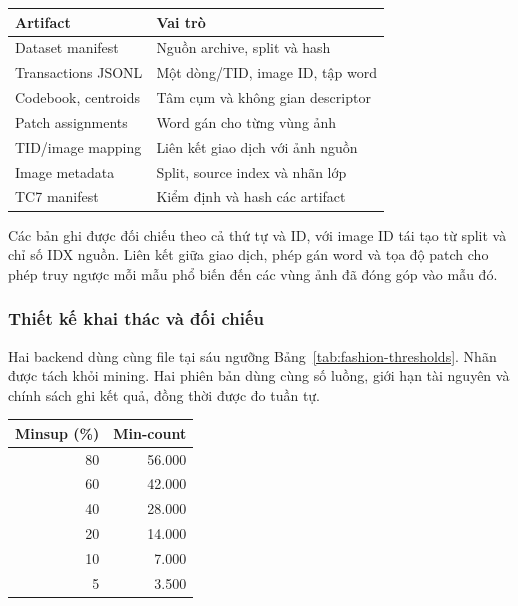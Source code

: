\begin{reporttable}
\caption{Artifact truy vết Fashion; các đường dẫn thuộc cùng một run.}
\label{tab:fashion-artifacts}
\footnotesize
\begin{tabular}{lp{}}\toprule
Artifact & Vai trò\\\midrule
Dataset manifest & Nguồn archive, split và hash\\
Transactions JSONL & Một dòng/TID, image ID, tập word\\
Codebook, centroids & Tâm cụm và không gian descriptor\\
Patch assignments & Word gán cho từng vùng ảnh\\
TID/image mapping & Liên kết giao dịch với ảnh nguồn\\
Image metadata & Split, source index và nhãn lớp\\
TC7 manifest & Kiểm định và hash các artifact\\\bottomrule
\end{tabular}
\end{reporttable}

Các bản ghi được đối chiếu theo cả thứ tự và ID, với image ID tái tạo
từ split và chỉ số IDX nguồn. Liên kết giữa giao dịch, phép gán word và
tọa độ patch cho phép truy ngược mỗi mẫu phổ biến đến các vùng ảnh đã
đóng góp vào mẫu đó.

\subsubsection{Thiết kế khai thác và đối chiếu}
Hai backend dùng cùng file tại sáu ngưỡng Bảng~\ref{tab:fashion-thresholds}.
Nhãn được tách khỏi mining. Hai phiên bản dùng cùng số luồng, giới hạn
tài nguyên và chính sách ghi kết quả, đồng thời được đo tuần tự.

\begin{reporttable}
\caption{Ngưỡng khai thác Fashion-MNIST trên mẫu số 70.000 ảnh.}
\label{tab:fashion-thresholds}
\small
\begin{tabular}{rr}\toprule
Minsup (\%) & Min-count\\\midrule
80 & 56.000\\60 & 42.000\\40 & 28.000\\
20 & 14.000\\10 & 7.000\\5 & 3.500\\\bottomrule
\end{tabular}
\end{reporttable}

